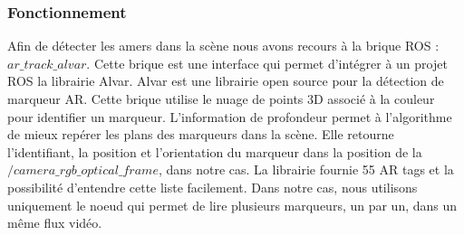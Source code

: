 \documentclass[10pt,a4paper]{article}
\begin{document}
\newpage
\subsubsection*{Fonctionnement}
Afin de détecter les amers dans la scène nous avons recours à la brique ROS : $ar\_track\_alvar$. Cette brique est une interface qui permet d'intégrer à un projet ROS la librairie Alvar. Alvar est une librairie open source pour la détection de marqueur AR.
Cette brique utilise le nuage de points 3D associé à la couleur pour identifier un marqueur. L'information de profondeur permet à l'algorithme de mieux repérer les plans des marqueurs dans la scène. Elle retourne l'identifiant, la position et l'orientation du marqueur dans la position de la $/camera\_rgb\_optical\_frame$, dans notre cas. La librairie fournie 55 AR tags et la possibilité d'entendre cette liste facilement. Dans notre cas, nous utilisons uniquement le noeud qui permet de lire plusieurs marqueurs, un par un, dans un même flux vidéo. 
\end{document}
